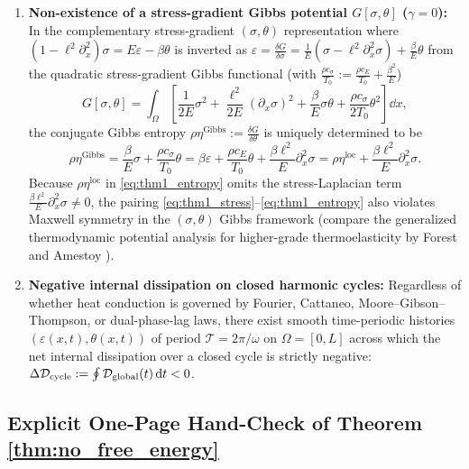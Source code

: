 \begin{theorem}
\begin{enumerate}[label=(\alph*),leftmargin=*]
  \item \textbf{Non-existence of a stress-gradient Gibbs potential $G[\sigma,\theta]$ ($\gamma=0$):} In the complementary stress-gradient $(\sigma,\theta)$ representation where $(1-\ell^2\partial_x^2)\sigma = E\varepsilon - \beta\theta$ is inverted as $\varepsilon = \frac{\delta G}{\delta\sigma} = \frac{1}{E}(\sigma - \ell^2\partial_x^2\sigma) + \frac{\beta}{E}\theta$ from the quadratic stress-gradient Gibbs functional (with $\frac{\rho c_\sigma}{T_0} := \frac{\rho c_E}{T_0} + \frac{\beta^2}{E}$)
  \begin{equation}\label{eq:gibbs_functional}
    G[\sigma,\theta] = \int_\Omega \left[\frac{1}{2E}\sigma^2 + \frac{\ell^2}{2E}(\partial_x\sigma)^2 + \frac{\beta}{E}\sigma\theta + \frac{\rho c_\sigma}{2T_0}\theta^2\right]\dd x,
  \end{equation}
  the conjugate Gibbs entropy $\rho\eta^{\mathrm{Gibbs}} := \frac{\delta G}{\delta\theta}$ is uniquely determined to be
  \begin{equation}\label{eq:gibbs_entropy}
    \rho\eta^{\mathrm{Gibbs}} = \frac{\beta}{E}\sigma + \frac{\rho c_\sigma}{T_0}\theta = \beta\varepsilon + \frac{\rho c_E}{T_0}\theta + \frac{\beta\ell^2}{E}\partial_x^2\sigma = \rho\eta^{\mathrm{loc}} + \frac{\beta\ell^2}{E}\partial_x^2\sigma.
  \end{equation}
  Because $\rho\eta^{\mathrm{loc}}$ in \eqref{eq:thm1_entropy} omits the stress-Laplacian term $\frac{\beta\ell^2}{E}\partial_x^2\sigma \neq 0$, the pairing \eqref{eq:thm1_stress}--\eqref{eq:thm1_entropy} also violates Maxwell symmetry in the $(\sigma,\theta)$ Gibbs framework (compare the generalized thermodynamic potential analysis for higher-grade thermoelasticity by Forest and Amestoy \cite{ForestAmestoy2008}).

  \item \textbf{Negative internal dissipation on closed harmonic cycles:} Regardless of whether heat conduction is governed by Fourier, Cattaneo, Moore--Gibson--Thompson, or dual-phase-lag laws, there exist smooth time-periodic histories $(\varepsilon(x,t),\theta(x,t))$ of period $\mathcal{T} = 2\pi/\omega$ on $\Omega = [0,L]$ across which the net internal dissipation over a closed cycle is strictly negative: $\Delta\mathcal{D}_{\mathrm{cycle}} := \oint \mathcal{D}_{\mathrm{global}}(t)\,\mathrm{d} t < 0$.
\end{enumerate}
\end{theorem}

\subsection{Explicit One-Page Hand-Check of Theorem \ref{thm:no_free_energy}}\label{subsec:hand_check}

